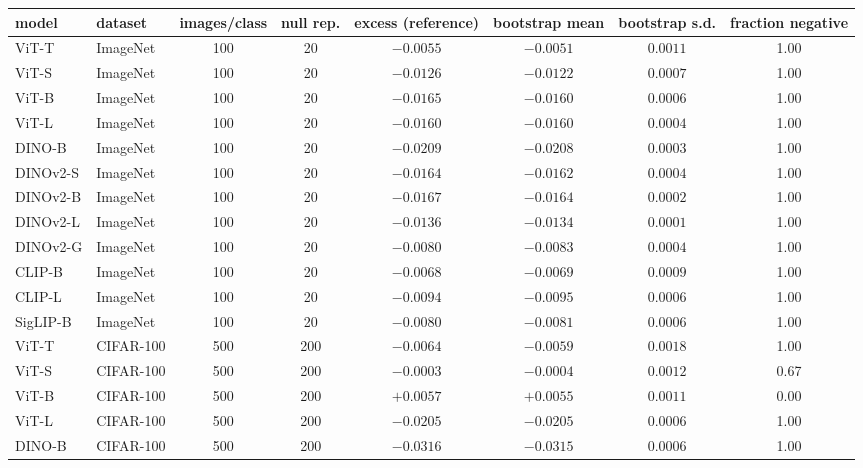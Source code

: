 \begin{table}[H]
\centering
\scriptsize
\setlength{\tabcolsep}{2.4pt}
\begingroup
\setlength{\tabcolsep}{3pt}
\begin{tabular}{llcccccc}
\toprule
model & dataset & images/class & null rep. & excess (reference) & bootstrap mean & bootstrap s.d. & fraction negative \\
\midrule
ViT-T & ImageNet & 100 & 20 & $-0.0055$ & $-0.0051$ & $0.0011$ & 1.00 \\
ViT-S & ImageNet & 100 & 20 & $-0.0126$ & $-0.0122$ & $0.0007$ & 1.00 \\
ViT-B & ImageNet & 100 & 20 & $-0.0165$ & $-0.0160$ & $0.0006$ & 1.00 \\
ViT-L & ImageNet & 100 & 20 & $-0.0160$ & $-0.0160$ & $0.0004$ & 1.00 \\
DINO-B & ImageNet & 100 & 20 & $-0.0209$ & $-0.0208$ & $0.0003$ & 1.00 \\
DINOv2-S & ImageNet & 100 & 20 & $-0.0164$ & $-0.0162$ & $0.0004$ & 1.00 \\
DINOv2-B & ImageNet & 100 & 20 & $-0.0167$ & $-0.0164$ & $0.0002$ & 1.00 \\
DINOv2-L & ImageNet & 100 & 20 & $-0.0136$ & $-0.0134$ & $0.0001$ & 1.00 \\
DINOv2-G & ImageNet & 100 & 20 & $-0.0080$ & $-0.0083$ & $0.0004$ & 1.00 \\
CLIP-B & ImageNet & 100 & 20 & $-0.0068$ & $-0.0069$ & $0.0009$ & 1.00 \\
CLIP-L & ImageNet & 100 & 20 & $-0.0094$ & $-0.0095$ & $0.0006$ & 1.00 \\
SigLIP-B & ImageNet & 100 & 20 & $-0.0080$ & $-0.0081$ & $0.0006$ & 1.00 \\
\midrule
ViT-T & CIFAR-100 & 500 & 200 & $-0.0064$ & $-0.0059$ & $0.0018$ & 1.00 \\
ViT-S & CIFAR-100 & 500 & 200 & $-0.0003$ & $-0.0004$ & $0.0012$ & 0.67 \\
ViT-B & CIFAR-100 & 500 & 200 & $+0.0057$ & $+0.0055$ & $0.0011$ & 0.00 \\
ViT-L & CIFAR-100 & 500 & 200 & $-0.0205$ & $-0.0205$ & $0.0006$ & 1.00 \\
DINO-B & CIFAR-100 & 500 & 200 & $-0.0316$ & $-0.0315$ & $0.0006$ & 1.00 \\

\end{tabular}
\end{table}
